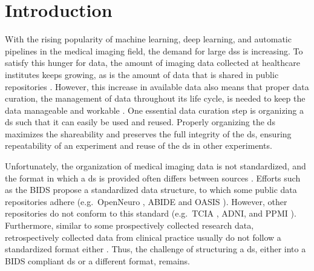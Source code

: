 
\section{Introduction}

With the rising popularity of machine learning, deep learning, and automatic pipelines in the medical imaging field, the demand for large \glspl{ds} is increasing.
To satisfy this hunger for data, the amount of imaging data collected at healthcare institutes keeps growing, as is the amount of data that is shared in public repositories \autocite{greenspan2016deep, lundervold2019overview}.
However, this increase in available data also means that proper data curation, the management of data throughout its life cycle, is needed to keep the data manageable and workable \autocite{prevedello2019challenges, vanooijen2019quality}.
One essential data curation step is organizing a \gls{ds} such that it can easily be used and reused.
Properly organizing the \gls{ds} maximizes the shareability and preserves the full integrity of the \gls{ds}, ensuring repeatability of an experiment and reuse of the \gls{ds} in other experiments.

Unfortunately, the organization of medical imaging data is not standardized, and the format in which a \gls{ds} is provided often differs between sources \autocite{lambin2017radiomics, vanooijen2019quality}.
Efforts such as the \gls{BIDS} \autocite{gorgolewski2016brain} propose a standardized data structure, to which some public data repositories adhere (e.g.\ OpenNeuro \autocite{gorgolewski2017openneuro}, \gls{ABIDE} \autocite{dimartino2017enhancing} and \gls{OASIS} \autocite{lamontagne2018oasis}).
However, other repositories do not conform to this standard (e.g.\ \gls{TCIA} \autocite{clark2013cancer}, \gls{ADNI}, and \gls{PPMI} \autocite{marek2018parkinson}).
Furthermore, similar to some prospectively collected research data, retrospectively collected data from clinical practice usually do not follow a standardized format either \autocite{vanooijen2019quality}.
Thus, the challenge of structuring a \gls{ds}, either into a \gls{BIDS} compliant \gls{ds} or a different format, remains.

